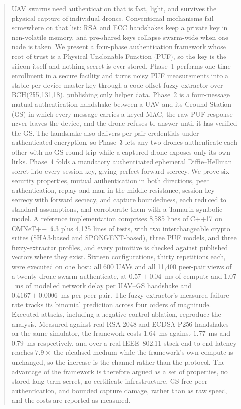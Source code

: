 \documentclass[journal]{IEEEtran}
\begin{document}
\begin{abstract}
UAV swarms need authentication that is fast, light, and survives the physical
capture of individual drones. Conventional mechanisms fail somewhere on that
list: RSA and ECC handshakes keep a private key in non-volatile memory, and
pre-shared keys collapse swarm-wide when one node is taken. We present a
four-phase authentication framework whose root of trust is a Physical
Unclonable Function (PUF), so the key is the silicon itself and nothing secret
is ever stored. Phase~1 performs one-time enrollment in a secure facility and
turns noisy PUF measurements into a stable per-device master key through a
code-offset fuzzy extractor over BCH(255,131,18), publishing only helper data.
Phase~2 is a four-message mutual-authentication handshake between a UAV and its
Ground Station (GS) in which every message carries a keyed MAC, the raw PUF
response never leaves the device, and the drone refuses to answer until it has
verified the GS. The handshake also delivers per-pair credentials under
authenticated encryption, so Phase~3 lets any two drones authenticate each
other with no GS round trip while a captured drone exposes only its own links.
Phase~4 folds a mandatory authenticated ephemeral Diffie--Hellman secret into
every session key, giving perfect forward secrecy. We prove six security
properties, mutual authentication in both directions, peer authentication,
replay and man-in-the-middle resistance, session-key secrecy with forward
secrecy, and capture boundedness, each reduced to standard assumptions, and
corroborate them with a Tamarin symbolic model. A reference implementation
comprises 8{,}585 lines of C++17 on OMNeT++~6.3 plus 4{,}125 lines of tests,
with two interchangeable crypto suites (SHA3-based and SPONGENT-based), three
PUF models, and three fuzzy-extractor profiles, and every primitive is checked
against published vectors where they exist. Sixteen configurations, thirty
repetitions each, were executed on one host: all 600 UAVs and all 11{,}400
peer-pair views of a twenty-drone swarm authenticate, at $0.57 \pm 0.04$~ms of
compute and $1.07$~ms of modelled network delay per UAV--GS handshake and
$0.4167 \pm 0.0006$~ms per peer pair. The fuzzy extractor's measured failure
rate tracks its binomial
prediction across four orders of magnitude. Executed attacks, including a
negative-control ablation, reproduce the analysis. Measured against real
RSA-2048 and ECDSA-P256 handshakes on the same simulator, the framework costs
$1.64$~ms against $1.77$~ms and $0.79$~ms respectively, and over a real
IEEE~802.11 stack end-to-end latency reaches $7.9\times$ the idealised medium
while the framework's own compute is unchanged, so the increase is the channel
rather than the protocol. The advantage of the framework is
therefore argued as a set of properties, no stored long-term secret, no
certificate infrastructure, GS-free peer authentication, and bounded capture
damage, rather than as raw speed, and the costs are reported as measured.
\end{abstract}
\end{document}
